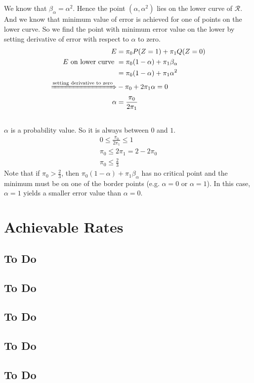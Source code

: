 \documentclass{article}
\numberwithin{equation}{section}
\begin{document}
\subsection{}
We know that \(\beta_\alpha = \alpha^2\). Hence the point \((\alpha, \alpha^2)\) lies on the lower curve of \(\mathcal{R}\).
And we know that minimum value of error is achieved for one of points on the lower curve.
So we find the point with minimum error value on the lower by setting derivative of error with respect to \(\alpha\) to zero.
\begin{align}
E &= \pi_0P(Z=1) + \pi_1 Q(Z=0)\\
E \text{ on lower curve } &= \pi_0 (1-\alpha) + \pi_1 \beta_\alpha\\
&= \pi_0 (1-\alpha) + \pi_1 \alpha^2\\
\xRightarrow{\text{setting derivative to zero}}& - \pi_0 + 2\pi_1 \alpha = 0\\
\alpha &= \frac{\pi_0}{2\pi_1}
\end{align}

\subsection{}
\(\alpha\) is a probability value. So it is always between \(0\) and \(1\).
\begin{gather}
0 \le \frac{\pi_0}{2\pi_1} \le 1\\
\pi_0 \le 2\pi_1 = 2 - 2\pi_0\\
\pi_0 \le \frac{2}{3}
\end{gather}
Note that  if \(\pi_0 > \frac{2}{3}\), then \(\pi_0 (1-\alpha) + \pi_1 \beta_\alpha\) has no critical point and the minimum must be on one of the border points (e.g. \(\alpha = 0 \text{ or } \alpha = 1\)).
In this case, \(\alpha = 1\) yields a smaller error value than \(\alpha = 0\).

\section{Achievable Rates}
\subsection{To Do}
\subsection{To Do}
\subsection{To Do}
\subsection{To Do}
\subsection{To Do}
\end{document}
